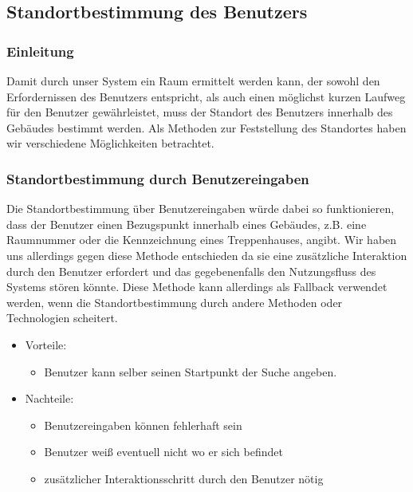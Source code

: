 \subsection{Standortbestimmung des Benutzers}
\label{sec:Standortbestimmung_des_Benutzers}

\subsubsection{Einleitung}
\label{sec:Standortbestimmung_des_Benutzers_Einleitung}

Damit durch unser System ein Raum ermittelt werden kann, der sowohl den
Erfordernissen des Benutzers entspricht, als auch einen möglichst kurzen
Laufweg für den Benutzer gewährleistet, muss der Standort des Benutzers
innerhalb des Gebäudes bestimmt werden.
Als Methoden zur Feststellung des Standortes haben wir verschiedene
Möglichkeiten betrachtet.

\subsubsection{Standortbestimmung durch Benutzereingaben}
\label{sec:Standortbestimmung_durch_Benutzereingaben}

Die Standortbestimmung über Benutzereingaben würde dabei so funktionieren, dass
der Benutzer einen Bezugspunkt innerhalb eines Gebäudes, z.B. eine Raumnummer
oder die Kennzeichnung eines Treppenhauses, angibt. Wir haben uns allerdings
gegen diese Methode entschieden da sie eine zusätzliche Interaktion
durch den Benutzer erfordert und das gegebenenfalls den Nutzungsfluss des
Systems stören könnte. Diese Methode kann allerdings als Fallback verwendet
werden, wenn die Standortbestimmung durch andere Methoden oder Technologien
scheitert.

\begin{itemize}
	\item Vorteile:
	\begin{itemize}
		\item Benutzer kann selber seinen Startpunkt der Suche angeben.
	\end{itemize}
	\item Nachteile:
	\begin{itemize}
		\item Benutzereingaben können fehlerhaft sein
		\item Benutzer weiß eventuell nicht wo er sich befindet
		\item zusätzlicher Interaktionsschritt durch den Benutzer nötig
	\end{itemize}
\end{itemize}

